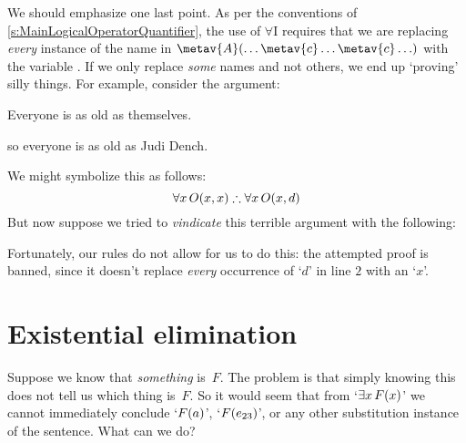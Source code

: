 We should emphasize one last point. As per the conventions of \cref{s:MainLogicalOperatorQuantifier}, the use of $\forall$I requires that we are replacing \emph{every} instance of the name  in $\metav{A}(\ldots \metav{c}\ldots\metav{c}\ldots)$ with the variable . If we only replace \emph{some} names and not others, we end up `proving' silly things. For example, consider the argument:
	\begin{earg}
	\item Everyone is as old as themselves.
	\item[\texttherefore] so everyone is as old as Judi Dench.
	\end{earg}
We might symbolize this as follows:
$$\forall x\,\atom{O}{x,x} \therefore \forall x\,\atom{O}{x,d}$$
But now suppose we tried to \emph{vindicate} this terrible argument with the following:
\begin{fitchproof}
	\PR
\end{fitchproof}
Fortunately, our rules do not allow for us to do this: the attempted proof is banned, since it doesn't replace \emph{every} occurrence of `$d$' in line $2$ with an `$x$'.

\section{Existential elimination}
Suppose we know that \emph{something} is~$F$. The problem is that simply knowing this does not tell us which thing is~$F$. So it would seem that from `$\exists x\,\mathord{F}(x)$' we cannot immediately conclude `$\mathord{F}(a)$', `$\mathord{F}(e_{23})$', or any other substitution instance of the sentence. What can we do?

